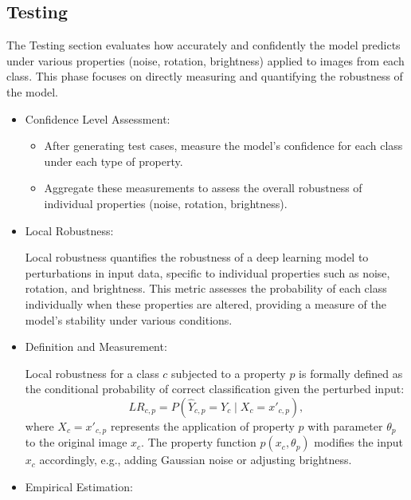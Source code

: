 \documentclass[10pt, conference, a4paper, final]{IEEEtran}
\begin{document}
\subsection{Testing }

The Testing section evaluates how accurately and confidently the model predicts under various properties (noise, rotation, brightness) applied to images from each class. This phase focuses on directly measuring and quantifying the robustness of the model.
\begin{itemize}

    \item Confidence Level Assessment:
        \begin{itemize}
            \item After generating test cases, measure the model’s confidence for each class under each type of property.
            \item Aggregate these measurements to assess the overall robustness of individual properties (noise, rotation, brightness).
        \end{itemize}

        \item Local Robustness:
      
        Local robustness quantifies the robustness of a deep learning model to perturbations in input data, specific to individual properties such as noise, rotation, and brightness. This metric assesses the probability of each class individually when these properties are altered, providing a measure of the model's stability under various conditions.

        \item Definition and Measurement:
        
        Local robustness for a class \(c\) subjected to a property \(p\) is formally defined as the conditional probability of correct classification given the perturbed input:
        \begin{equation}
            LR_{c,p} = P(\hat{Y}_{c,p} = Y_c \mid X_c = x'_{c,p}),
        \end{equation}
        where \(X_c = x'_{c,p}\) represents the application of property \(p\) with parameter \(\theta_p\) to the original image \(x_c\). The property function \(p(x_c, \theta_p)\) modifies the input \(x_c\) accordingly, e.g., adding Gaussian noise or adjusting brightness.

        \item Empirical Estimation: 
        

\end{itemize}
\end{document}
